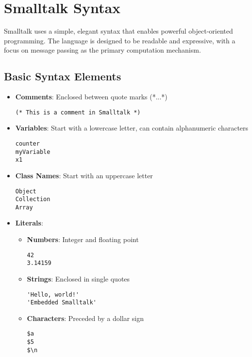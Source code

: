 \documentclass[12pt,a4paper]{report}
\begin{document}
\chapter{Smalltalk Syntax}

Smalltalk uses a simple, elegant syntax that enables powerful object-oriented programming. The language is designed to be readable and expressive, with a focus on message passing as the primary computation mechanism.

\section{Basic Syntax Elements}

\begin{itemize}
    \item \textbf{Comments}: Enclosed between quote marks (*...*)
    \begin{lstlisting}[style=smalltalk]
(* This is a comment in Smalltalk *)
\end{lstlisting}

    \item \textbf{Variables}: Start with a lowercase letter, can contain alphanumeric characters
    \begin{lstlisting}[style=smalltalk]
counter
myVariable
x1
\end{lstlisting}

    \item \textbf{Class Names}: Start with an uppercase letter 
    \begin{lstlisting}[style=smalltalk]
Object
Collection
Array
\end{lstlisting}

    \item \textbf{Literals}:
    \begin{itemize}
        \item \textbf{Numbers}: Integer and floating point
        \begin{lstlisting}[style=smalltalk]
42
3.14159
\end{lstlisting}

        \item \textbf{Strings}: Enclosed in single quotes
        \begin{lstlisting}[style=smalltalk]
'Hello, world!'
'Embedded Smalltalk'
\end{lstlisting}

        \item \textbf{Characters}: Preceded by a dollar sign
        \begin{lstlisting}[style=smalltalk]
$a
$5
$\n
\end{lstlisting}


\end{itemize}
\end{itemize}
\end{document}
